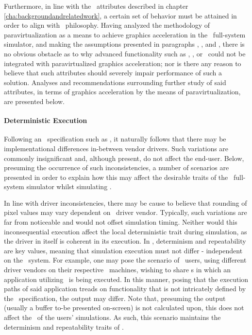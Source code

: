 Furthermore, in line with the \dvttermsimics\ attributes described in chapter \ref{cha:backgroundandrelatedwork}, a certain set of behavior must be attained in order to align with \dvttermsimics\ philosophy.
Having analyzed the methodology of paravirtualization as a means to achieve graphics acceleration in the \dvttermsimics\ full-system simulator, and making the assumptions presented in paragraphs , , and , there is no obvious obstacle as to why advanced functionality such as \dvttermdeterministicexecution , \dvttermcheckpointing , or \dvttermreverseexecution\ could not be integrated with paravirtualized graphics acceleration; nor is there any reason to believe that such attributes should severely impair performance of such a solution.
Analyses and recommendations surrounding further study of said attributes, in terms of graphics acceleration by the means of paravirtualization, are presented below.

\paragraph{Deterministic Execution}
\label{par:discussion_deterministicexecution}
Following an \dvttermapi\ specification such as \dvttermopengles , it naturally follows that there may be implementational differences in-between vendor drivers.
Such variations are commonly insignificant and, although present, do not affect the end-user.
Below, presuming the occurrence of such inconsistencies, a number of scenarios are presented in order to explain how this may affect the desirable traits of the \dvttermsimics\ full-system simulator whilst simulating \dvttermopengles .

In line with driver inconsistencies, there may be cause to believe that rounding of pixel values may vary dependent on \dvttermhost\ driver vendor.
Typically, such variations are far from noticeable and would not offset simulation timing.
Neither would this inconsequential execution affect the local deterministic trait during simulation, as the driver in itself is coherent in its execution.
In \dvttermsimics , determinism and repeatability are key values, meaning that simulation execution must not differ - independent on the \dvttermhost\ system.
For example, one may pose the scenario of \dvttermsimics\ users, using different driver vendors on their respective \dvttermhost\ machines, wishing to share \dvttermcheckpoint s in which an application utilizing \dvttermopengles\ is being executed.
In this manner, posing that the execution paths of said application treads on functionality that is not intricately defined by the \dvttermopengles\ specification, the output may differ.
Note that, presuming the output (usually a buffer to-be presented on-screen) is not calculated upon, this does not affect the \dvttermtiming\ of the users' simulations.
As such, this scenario maintains the determinism and repeatability traits of \dvttermsimics .


